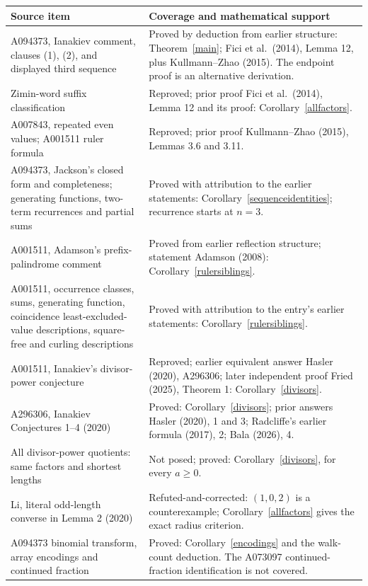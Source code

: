 \documentclass[11pt]{article}
\begin{document}
\smallskip
\noindent\small
\begin{longtable}{@{}p{}p{}@{}}
\toprule
Source item & Coverage and mathematical support\\
\midrule
A094373, Ianakiev comment, clauses (1), (2), and displayed third sequence
& Proved by deduction from earlier structure: Theorem~\ref{main};
Fici et al.\ (2014), Lemma 12, plus Kullmann--Zhao (2015).
The endpoint proof is an alternative derivation.\\
Zimin-word suffix classification
& Reproved; prior proof Fici et al.\ (2014), Lemma 12 and its proof:
Corollary~\ref{allfactors}.\\
A007843, repeated even values; A001511 ruler formula
& Reproved; prior proof Kullmann--Zhao (2015), Lemmas 3.6 and 3.11.\\
A094373, Jackson's closed form and completeness; generating functions,
two-term recurrences and partial sums
& Proved with attribution to the earlier statements:
Corollary~\ref{sequenceidentities}; recurrence starts at $n=3$.\\
A001511, Adamson's prefix-palindrome comment
& Proved from earlier reflection structure; statement Adamson (2008):
Corollary~\ref{rulersiblings}.\\
A001511, occurrence classes, sums, generating function, coincidence
least-excluded-value descriptions, square-free and curling descriptions
& Proved with attribution to the entry's earlier statements:
Corollary~\ref{rulersiblings}.\\
A001511, Ianakiev's divisor-power conjecture
& Reproved; earlier equivalent answer Hasler (2020), A296306;
later independent proof Fried (2025), Theorem 1:
Corollary~\ref{divisors}.\\
A296306, Ianakiev Conjectures 1--4 (2020)
& Proved: Corollary~\ref{divisors}; prior answers Hasler (2020),
1 and 3; Radcliffe's earlier formula (2017), 2; Bala (2026), 4.\\
All divisor-power quotients: same factors and shortest lengths
& Not posed; proved: Corollary~\ref{divisors}, for every $a\ge0$.\\
Li, literal odd-length converse in Lemma 2 (2020)
& Refuted-and-corrected: $(1,0,2)$ is a counterexample;
Corollary~\ref{allfactors} gives the exact radius criterion.\\
A094373 binomial transform, array encodings and continued fraction
& Proved: Corollary~\ref{encodings} and the walk-count deduction.
The A073097 continued-fraction identification is not covered.\\

\end{longtable}
\end{document}
